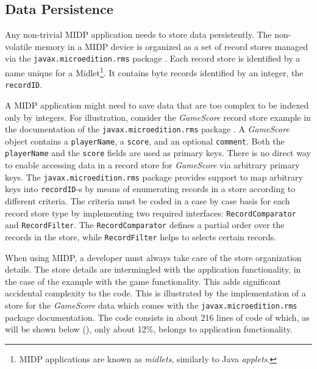 \subsection{Data Persistence}

Any non-trivial MIDP application needs to store data persistently. The non-volatile memory in a MIDP device is organized as a set of record stores managed via the {\tt ja\-vax.mi\-cro\-edi\-tion.rms} package \cite{www.midp}. Each record store is identified by a name unique for a Midlet\footnote{MIDP applications are known as \textit{midlets}, similarly to Java \textit{applets}.}. It contains byte records identified by an integer, the {\tt recordID}. 

A MIDP application might need to save data that are too complex to be indexed only by integers. For illustration, consider the \textit{Ga\-me\-Sco\-re} record store example in the documentation of the {\tt ja\-vax.micro\-edi\-tion.rms} package \cite{www.midp}. A \textit{Ga\-me\-Sco\-re} object contains a {\tt player\-Na\-me}, a {\tt score}, and an optional {\tt comment}. Both the {\tt player\-Na\-me} and the {\tt score} fields are used as primary keys. There is no direct way to enable accessing data in a record store for \textit{Ga\-me\-Sco\-re} via arbitrary primary keys. The {\tt ja\-vax.micro\-edi\-tion.rms} package provides support to map arbitrary keys into {\tt recordID}-s by means of enumerating records in a store according to different criteria. The criteria must be coded in a case by case basis for each record store type by implementing two required interfaces: {\tt Re\-cord\-Compa\-ra\-tor} and {\tt Re\-cord\-Fil\-ter}. The {\tt Re\-cord\-Compa\-ra\-tor} defines a partial order over the records in the store, while {\tt Re\-cord\-Fil\-ter} helps to selects certain records.

When using MIDP, a developer must always take care of the store organization details. The store details are intermingled with the application functionality, in the case of the example with the game functionality. This adds significant accidental complexity to the code. This is illustrated by the implementation of a store for the \textit{Ga\-me\-Sco\-re} data which comes with the {\tt ja\-vax.micro\-edi\-tion.rms} package \cite{www.midp} documentation. The code consists in about 216 lines of code of which, as will be shown below (), only about 12\%, belongs to application functionality.  

